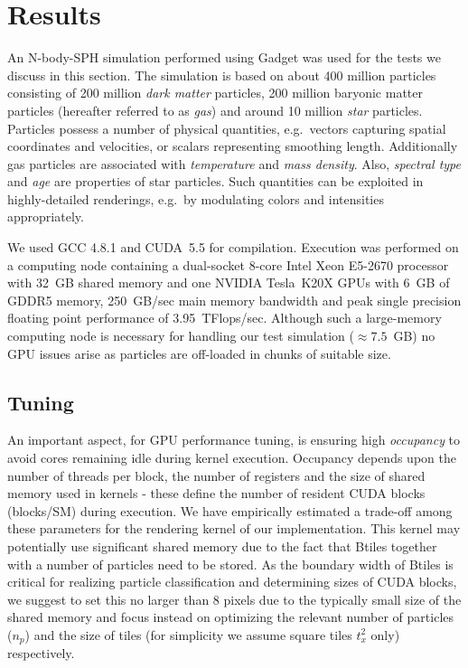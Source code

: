 \documentclass[preprint,5pt]{elsarticle}
\begin{document}
\section{Results}
\label{sec:results}

An N-body-SPH simulation performed using Gadget \cite{gadgeturl} was used for the tests we discuss in this section. The simulation is based on about 400 million particles consisting of 200 million {\it dark matter} particles, 200 million baryonic matter particles (hereafter referred to as {\it gas}) and around 10 million {\it star} particles. Particles possess a number of physical quantities, e.g.\ vectors capturing spatial coordinates and velocities, or scalars representing smoothing length. Additionally gas particles are associated with {\it temperature} and {\it mass density}. Also, {\it spectral type} and {\it age} are properties of star particles. Such quantities can be exploited in highly-detailed renderings, e.g.\ by modulating colors and intensities appropriately. 

We used GCC 4.8.1 and CUDA~5.5 for compilation. Execution was performed on a computing node containing a dual-socket 8-core Intel Xeon E5-2670 processor with 32~GB shared memory and one NVIDIA Tesla~K20X GPUs with 6~GB of GDDR5 memory, 250~GB/sec main memory bandwidth and peak single precision floating point performance of 3.95~TFlops/sec. Although such a large-memory computing node is necessary for handling our test simulation ($\approx 7.5$~GB) no GPU issues arise as particles are off-loaded in chunks of suitable size. 

\subsection{Tuning}
\label{sec:gpuperf}
An important aspect, for GPU performance tuning, is ensuring high {\it occupancy} to avoid cores remaining idle during kernel execution. Occupancy depends upon the number of threads per block, the number of registers and the size of shared memory used in kernels - these define the number of resident CUDA blocks (blocks/SM) during execution. We have empirically estimated a trade-off among these parameters for the rendering kernel of our implementation. This kernel may potentially use significant shared memory due to the fact that Btiles together with a number of particles need to be stored. As the boundary width of Btiles is critical for realizing particle classification and determining sizes of CUDA blocks, we suggest to set this no larger than 8 pixels due to the typically small size of the shared memory and focus instead on optimizing the relevant number of particles ($n_p$) and the size of tiles (for simplicity we assume square tiles $t_x^2$ only) respectively.
\end{document}
